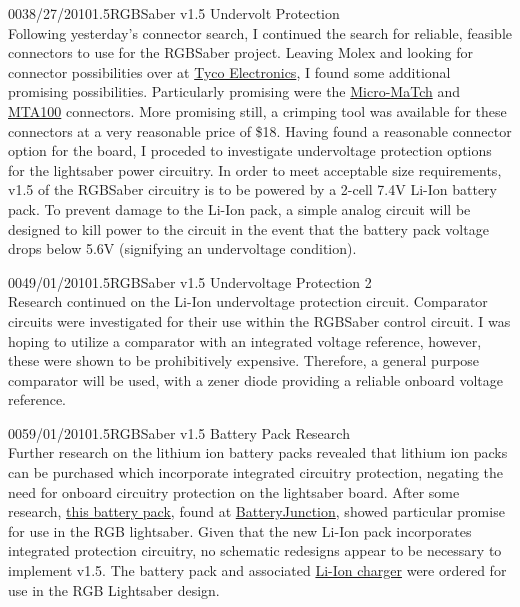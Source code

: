 \documentclass[12pt,letterpaper,onecolumn]{article}
\begin{document}
\begin{nbentry}{003}{8/27/2010}{1.5}{RGBSaber v1.5 Undervolt Protection}
\\
	Following yesterday's connector search, I continued the search for reliable, feasible connectors to use for the RGBSaber project. Leaving Molex and looking for connector possibilities over at \href{http://tycoelectronics.com}{Tyco Electronics}, I found some additional promising possibilities. Particularly promising were the \href{http://www.tycoelectronics.com/catalog/feat/en/c/11398?BML=10576,17560,23645,17587}{Micro-MaTch} and \href{http://www.tycoelectronics.com/catalog/feat/en/s/23478?BML=10576,17560,23645,17587}{MTA100} connectors. More promising still, a crimping tool was available for these connectors at a very reasonable price of \$18.
	Having found a reasonable connector option for the board, I proceded to investigate undervoltage protection options for the lightsaber power circuitry. In order to meet acceptable size requirements, v1.5 of the RGBSaber circuitry is to be powered by a 2-cell 7.4V Li-Ion battery pack. To prevent damage to the Li-Ion pack, a simple analog circuit will be designed to kill power to the circuit in the event that the battery pack voltage drops below 5.6V (signifying an undervoltage condition).
\end{nbentry}

\begin{nbentry}{004}{9/01/2010}{1.5}{RGBSaber v1.5 Undervoltage Protection 2}
\\
	Research continued on the Li-Ion undervoltage protection circuit. Comparator circuits were investigated for their use within the RGBSaber control circuit. I was hoping to utilize a comparator with an integrated voltage reference, however, these were shown to be prohibitively expensive. Therefore, a general purpose comparator will be used, with a zener diode providing a reliable onboard voltage reference.
\end{nbentry}

\begin{nbentry}{005}{9/01/2010}{1.5}{RGBSaber v1.5 Battery Pack Research}
\\
	Further research on the lithium ion battery packs revealed that lithium ion packs can be purchased which incorporate integrated circuitry protection, negating the need for onboard circuitry protection on the lightsaber board. After some research, \href{http://www.batteryjunction.com/tenergy-18650-2200-pk.html}{this battery pack}, found at \href{http://www.batteryjunction.com/}{BatteryJunction}, showed particular promise for use in the RGB lightsaber.
	Given that the new Li-Ion pack incorporates integrated protection circuitry, no schematic redesigns appear to be necessary to implement v1.5. The battery pack and associated \href{http://www.batteryjunction.com/unsmchforlib.html}{Li-Ion charger} were ordered for use in the RGB Lightsaber design.
\end{nbentry}
\end{document}
